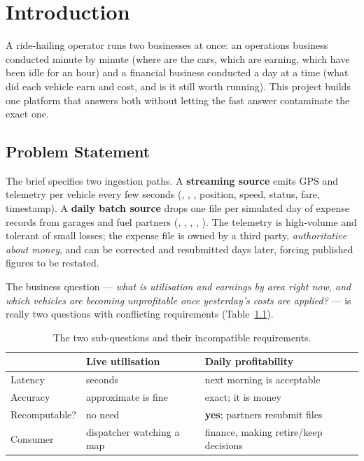 \chapter{Introduction}
\label{ch:introduction}

A ride-hailing operator runs two businesses at once: an operations
business conducted minute by minute (where are the cars, which are
earning, which have been idle for an hour) and a financial business
conducted a day at a time (what did each vehicle earn and cost, and is
it still worth running). This project builds one platform that answers
both without letting the fast answer contaminate the exact one.

\section{Problem Statement}
\label{sec:problem}

The brief specifies two ingestion paths. A \textbf{streaming source}
emits GPS and telemetry per vehicle every few seconds (,
, , position, speed, status, fare,
timestamp). A \textbf{daily batch source} drops one file per simulated
day of expense records from garages and fuel partners
(, , ,
, ). The telemetry is
high-volume and tolerant of small losses; the expense file is owned by a
third party, \emph{authoritative about money}, and can be corrected and
resubmitted days later, forcing published figures to be restated.

The business question --- \emph{what is utilisation and earnings by area
right now, and which vehicles are becoming unprofitable once yesterday's
costs are applied?} --- is really two questions with conflicting
requirements (Table~\ref{tab:two-questions}).

\begin{table}[htbp]
\centering
\caption{The two sub-questions and their incompatible requirements.}
\label{tab:two-questions}
\begin{tabularx}{\textwidth}{@{}lXX@{}}
\toprule
& \textbf{Live utilisation} & \textbf{Daily profitability}\\
\midrule
Latency       & seconds & next morning is acceptable\\
Accuracy      & approximate is fine & exact; it is money\\
Recomputable? & no need & \textbf{yes}; partners resubmit files\\
Consumer      & dispatcher watching a map & finance, making
                retire/keep decisions\\
\bottomrule
\end{tabularx}
\end{table}

